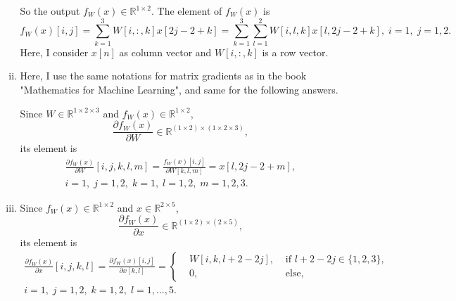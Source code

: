 \documentclass[10pt,a4paper]{article}
\theoremstyle{dotlessP}
\def\RR{\mathbb{R}}
\begin{document}
\begin{enumerate}[(a)]
\begin{enumerate}[(i)]
		So the output $f_W(x)\in\RR^{1\times 2}$. The element of $f_W(x)$ is 
		\begin{equation}
		f_W(x)[i,j] = \sum_{k=1}^{3} W[i,:,k] x[2j-2+k]=\sum_{k=1}^{3} \sum_{l=1}^2W[i,l,k] x[l,2j-2+k],\;i=1,\; j=1,2.
		\end{equation}
		Here, I consider $x[n]$ as column vector and $W[i,:,k]$ is a row vector.
		
		
		\item Here, I use the same notations for matrix gradients as in the book "Mathematics for Machine Learning", and same for the following answers.
		
		Since $W\in\RR^{1\times 2\times 3}$ and $f_W(x)\in\RR^{1\times 2}$,
		\begin{equation}
		\frac{\partial f_W(x)}{\partial W}\in \RR^{(1\times 2)\times (1\times 2\times 3)},
		\end{equation}
		its element is 
		\begin{equation}
		\begin{aligned}
		\frac{\partial f_W(x)}{\partial W}[i,j,k,l,m]=\frac{f_W(x)[i,j]}{\partial W[k,l,m]}
=  x[l,2j-2+m],\\
		 i=1,\; j=1,2,\; k=1,\; l=1,2,\;m=1,2,3.
		\end{aligned}
		\end{equation}
		
		\item Since $f_W(x)\in\RR^{1\times 2}$ and $x\in\RR^{2\times 5}$, 
		\begin{equation}
		\frac{\partial f_W(x)}{\partial x}\in\RR^{(1\times 2) \times (2\times 5) },
		\end{equation}
		its element is 
		\begin{equation*}
		\begin{aligned}
		\frac{\partial f_W(x)}{\partial x}[i,j,k,l]=\frac{\partial f_W(x)[i,j]}{\partial x[k,l]}=\left\lbrace 
		\begin{aligned}
	&	W[i,k,l+2-2j], & \text{ if } l+2-2j\in\{1,2,3\},\\
	&	0, & \text{ else,}
		\end{aligned}
		\right. \\i=1,\; j=1,2, \; k=1,2, \; l=1,\ldots, 5.
		\end{aligned}
		\end{equation*}
		

\end{enumerate}
\end{enumerate}
\end{document}

